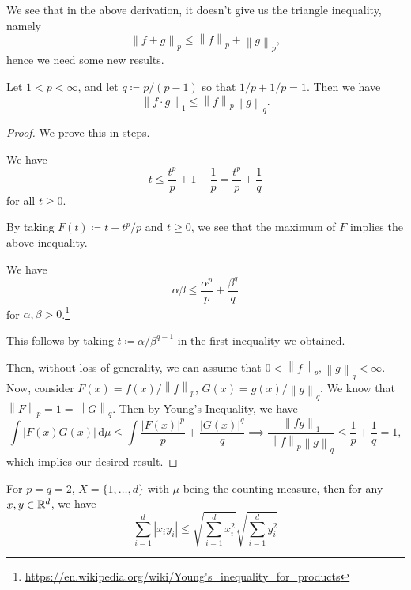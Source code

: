 We see that in the above derivation, it doesn't give us the triangle inequality, namely
\[
	\left\lVert f + g\right\rVert _p \leq  \left\lVert f\right\rVert _p + \left\lVert g\right\rVert _p,
\]
hence we need some new results.

\begin{theorem}\label{thm:Holder-inequality}
	Let \(1 < p < \infty \), and let \(q \coloneqq p / (p - 1)\) so that \(1 / p + 1 / p = 1\). Then we have
	\[
		\left\lVert f\cdot g\right\rVert _1 \leq  \left\lVert f\right\rVert _p \left\lVert g\right\rVert _q.
	\]
\end{theorem}
\begin{proof}
	We prove this in steps.
	\begin{claim}
		We have
		\[
			t\leq \frac{t^p}{p}+1-\frac{1}{p} = \frac{t^p}{p}+ \frac{1}{q}
		\]
		for all \(t \geq 0\).
	\end{claim}
	\begin{explanation}
		By taking \(F(t) \coloneqq t - t^p / p\) and \(t \geq 0\), we see that the maximum of \(F\) implies the above inequality.
	\end{explanation}
	\begin{claim}
		We have
		\[
			\alpha \beta \leq \frac{\alpha ^p}{p} + \frac{\beta ^q}{q}
		\]
		for \(\alpha , \beta > 0\).\footnote{\url{https://en.wikipedia.org/wiki/Young's_inequality_for_products}}
	\end{claim}
	\begin{explanation}
		This follows by taking \(t \coloneqq \alpha /\beta ^{q - 1}\) in the first inequality we obtained.
	\end{explanation}

	Then, without loss of generality, we can assume that \(0 <\left\lVert f\right\rVert _p, \left\lVert g\right\rVert _q < \infty \). Now, consider \(F(x) = f(x) / \left\lVert f\right\rVert _p\),
	\(G(x) = g(x) / \left\lVert g\right\rVert _q\). We know that \(\left\lVert F\right\rVert _p = 1 = \left\lVert G\right\rVert _q\). Then by Young's Inequality, we have
	\[
		\int \left\vert F(x)G(x) \right\vert \,\mathrm{d} \mu \leq \int \frac{\left\vert F(x) \right\vert ^p}{p} + \frac{\left\vert G(x) \right\vert ^q}{q} \implies \frac{\left\lVert fg\right\rVert _1}{\left\lVert f\right\rVert _p \left\lVert g\right\rVert _q}\leq \frac{1}{p} + \frac{1}{q} = 1,
	\]
	which implies our desired result.
\end{proof}
\begin{eg}
	For \(p = q = 2\), \(X = \{1, \ldots , d \}\) with \(\mu \) being the \hyperref[eg:counting-measure]{counting measure}, then for any \(x, y\in \mathbb{\MakeUppercase{r}} ^d\), we have
	\[
		\sum\limits_{i=1}^{d} \left\vert x_{i} y_{i}  \right\vert \leq \sqrt{\sum\limits_{i=1}^{d} x_{i} ^{2} } \sqrt{\sum\limits_{i=1}^{d} y_{i} ^{2} }
	\]
\end{eg}

